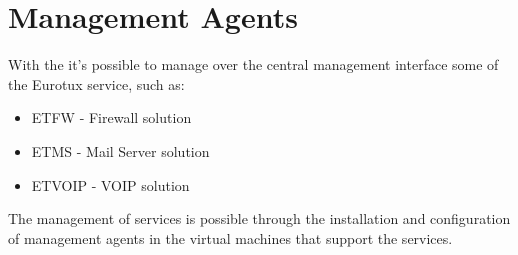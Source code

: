 
\chapter{\textsf{Management Agents}}

With the \acronym it's possible to manage over the central management interface some of the Eurotux service, such as:
\begin{itemize}
	\item ETFW - Firewall solution
	\item ETMS - Mail Server solution
	\item ETVOIP - VOIP solution
\end{itemize}
    
The management of services is possible through the installation and configuration of management agents in the virtual machines that support the services.



\pagebreak

\pagebreak




